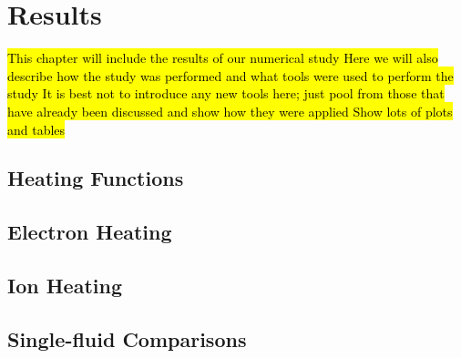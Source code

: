 \chapter{Results}
\label{ch:results}
\hl{This chapter will include the results of our numerical study
Here we will also describe how the study was performed and what tools were used to perform the study
It is best not to introduce any new tools here; just pool from those that have already been discussed and show how they were applied
Show lots of plots and tables}
\section{Heating Functions}
%
\section{Electron Heating}
%
\section{Ion Heating}
%
\section{Single-fluid Comparisons}